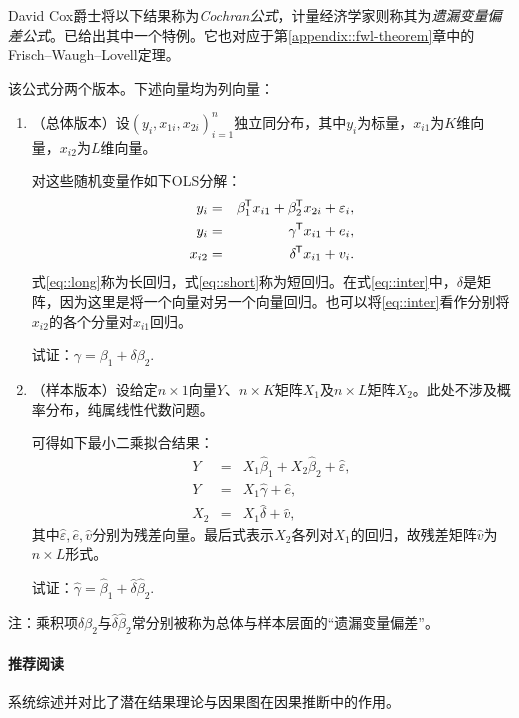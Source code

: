David Cox爵士将以下结果称为{\it Cochran公式}\citep{cochran1938omission, cox2007generalization}，计量经济学家则称其为{\it 遗漏变量偏差公式}\citep{angrist2008mostly}。\citet{fisher1925statistical}已给出其中一个特例。它也对应于第\ref{appendix::fwl-theorem}章中的Frisch–Waugh–Lovell定理。  

该公式分两个版本。下述向量均为列向量： 

\begin{enumerate}
[(1)]
\item
（总体版本）设$(y_i, x_{1i}, x_{2i})_{i=1}^n$独立同分布，其中$y_i$为标量，$x_{i1}$为$K$维向量，$x_{i2}$为$L$维向量。 

对这些随机变量作如下OLS分解：\begin{eqnarray}
y_i &=& \beta_1 ^{\mkern-1.5mu\mathsf{T}} x_{i1} + \beta_2  ^{\mkern-1.5mu\mathsf{T}} x_{2i} + \varepsilon_i , \label{eq::long}\\
y_i&=&\gamma  ^{\mkern-1.5mu\mathsf{T}} x_{i1} + e_i, \label{eq::short}\\
x_{i2} &=& \delta  ^{\mkern-1.5mu\mathsf{T}} x_{i1} + v_i . \label{eq::inter}
\end{eqnarray}式\eqref{eq::long}称为长回归，式\eqref{eq::short}称为短回归。在式\eqref{eq::inter}中，$\delta$是矩阵，因为这里是将一个向量对另一个向量回归。也可以将\eqref{eq::inter}看作分别将$x_{i2}$的各个分量对$x_{i1}$回归。 

试证：$\gamma = \beta_1 + \delta \beta_2.$


\item
（样本版本）设给定$n\times 1$向量$Y$、$n\times K$矩阵$X_1$及$n\times L$矩阵$X_2$。此处不涉及概率分布，纯属线性代数问题。 

可得如下最小二乘拟合结果：
\begin{eqnarray*}
Y &=& X_1 \hat{\beta}_1 + X_2 \hat{\beta}_2+ \hat{\varepsilon},\\
Y &=& X_1 \hat{\gamma} + \hat{e} ,\\
X_2 &=& X_1 \hat{\delta} + \hat{v},
\end{eqnarray*}
其中$\hat{\varepsilon},  \hat{e}, \hat{v}$分别为残差向量。最后式表示$X_2$各列对$X_1$的回归，故残差矩阵$\hat{v}$为$n\times L$形式。

试证：$\hat{\gamma} = \hat{\beta}_1 +  \hat{\delta} \hat{\beta}_2$.

\end{enumerate}

 
注：乘积项$\delta \beta_2$与$\hat{\delta} \hat{\beta}_2$常分别被称为总体与样本层面的“遗漏变量偏差”。 
 
 
 \paragraph{推荐阅读} 
 
\citet{imbens2020potential}系统综述并对比了潜在结果理论与因果图在因果推断中的作用。 



